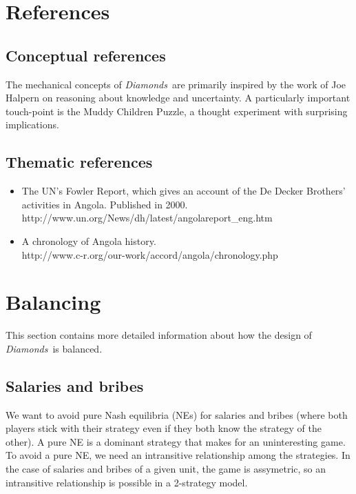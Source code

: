 \documentclass[12pt]{article}
\newcommand{\gtitle}{{\it Diamonds}}
\begin{document}
\section{References}

\subsection{Conceptual references}
The mechanical concepts of \gtitle\ are primarily inspired by the work of Joe Halpern on reasoning about knowledge and uncertainty.  A particularly important touch-point is the Muddy Children Puzzle, a thought experiment with surprising implications.


\subsection{Thematic references}
\begin{itemize}
\item The UN's Fowler Report, which gives an account of the De Decker Brothers' activities in Angola.  Published in 2000.\\
http://www.un.org/News/dh/latest/angolareport\_eng.htm

\item A chronology of Angola history.\\
http://www.c-r.org/our-work/accord/angola/chronology.php
\end{itemize}


\newpage

\section{Balancing}
This section contains more detailed information about how the design of \gtitle\ is balanced.

\subsection{Salaries and bribes}
We want to avoid pure Nash equilibria (NEs) for salaries and bribes (where both players stick with their strategy even if they both know the strategy of the other).  A pure NE is a dominant strategy that makes for an uninteresting game.  To avoid a pure NE, we need an intransitive relationship among the strategies.  In the case of salaries and bribes of a given unit, the game is assymetric, so an intransitive relationship is possible in a 2-strategy model.
\end{document}
